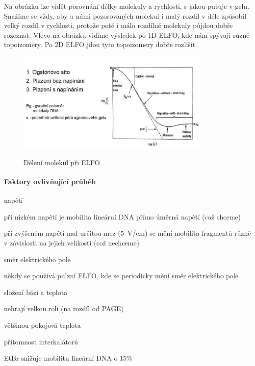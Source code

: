 \documentclass[DIV=8]{scrreprt}
\begin{document}
Na obrázku lze vidět porovnání délky molekuly a rychlosti, s jakou putuje v gelu. Snažíme se vždy, aby u námi pozorovaných molekul i malý rozdíl v déle způsobil velký rozdíl v rychlosti, protože poté i málo rozdílné molekuly půjdou dobře rozeznat. Vlevo na obrázku vidíme výsledek po 1D ELFO, kde nám spývají různé topoizomery. Po 2D ELFO jdou tyto topoizomery dobře rozlišit.
\begin{figure}
    \caption{Dělení molekul při ELFO}
    \includegraphics[width=0.85\textwidth]{slides-6/slide-10.jpg}
    \centering
    \label{}
\end{figure}


\paragraph{Faktory ovlivňující průběh}
\begin{myItemize}[nosep]
    \item napětí
\begin{myItemize}[nosep]
    \item při nízkém napětí je mobilita lineární DNA přímo úměrná napětí (což chceme)
    \item při zvýšeném napětí nad určitou mez (\si{5 V/cm}) se mění mobilita fragmentů různě v závislosti na jejich velikosti (což nechceme)
\end{myItemize}

    \item směr elektrického pole
\begin{myItemize}[nosep]
    \item někdy se používá pulzní ELFO, kde se periodicky mění směr elektrického pole
\end{myItemize}

    \item složení bází a teplota
\begin{myItemize}[nosep]
    \item nehrají velkou roli (na rozdíl od PAGE)
    \item většinou pokojová teplota
\end{myItemize}

    \item přítomnost interkalátorů
\begin{myItemize}[nosep]
    \item EtBr snižuje mobilitu lineární DNA o 15\%
\end{myItemize}

\end{myItemize}
\end{document}
